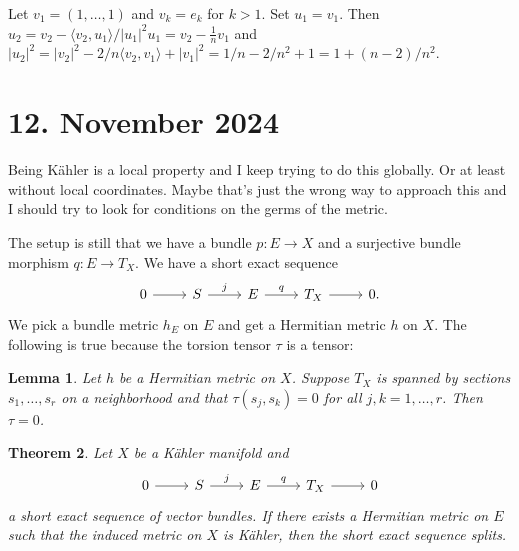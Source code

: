 \documentclass[11pt]{amsart}
\newtheorem{theo}{Theorem}
\newtheorem{lemm}[theo]{Lemma}
\theoremstyle{definition}
\def\<{\langle}
\def\>{\rangle}
\begin{document}
Let $v_1 = (1,\ldots,1)$ and $v_k = e_k$ for $k > 1$.
Set $u_1 = v_1$.
Then $u_2 = v_2 - \<v_2, u_1\>/|u_1|^2 u_1 = v_2 - \frac1n v_1$ and $|u_2|^2 = |v_2|^2 - 2/n \<v_2,v_1\> + |v_1|^2 = 1/n - 2/n^2 + 1 = 1 + (n-2)/n^2$.


\section{12. November 2024}

Being K\"ahler is a local property and I keep trying to do this globally.
Or at least without local coordinates.
Maybe that's just the wrong way to approach this and I should try to look for conditions on the germs of the metric.

The setup is still that we have a bundle $p : E \to X$ and a surjective bundle morphism $q : E \to T_X$.
We have a short exact sequence
\[
\begin{tikzcd}
0 \ar[r] &
S \ar[r,"j"] &
E \ar[r,"q"] &
T_X \ar[r] &
0.
\end{tikzcd}
\]
We pick a bundle metric $h_E$ on $E$ and get a Hermitian metric $h$ on $X$.
The following is true because the torsion tensor $\tau$ is a tensor:


\begin{lemm}
Let $h$ be a Hermitian metric on $X$.
Suppose $T_X$ is spanned by sections $s_1, \ldots, s_r$ on a neighborhood and that $\tau(s_j, s_k) = 0$ for all $j,k = 1,\ldots,r$.
Then $\tau = 0$.
\end{lemm}


\begin{theo}
Let $X$ be a K\"ahler manifold and
\[
\begin{tikzcd}
0 \ar[r] &
S \ar[r,"j"] &
E \ar[r,"q"] &
T_X \ar[r] &
0
\end{tikzcd}
\]
a short exact sequence of vector bundles.
If there exists a Hermitian metric on $E$ such that the induced metric on $X$ is K\"ahler, then the short exact sequence splits.
\end{theo}
\end{document}

